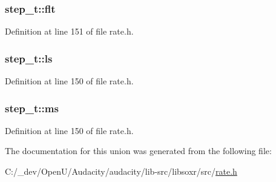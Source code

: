 \subsubsection[{\texorpdfstring{flt}{flt}}]{ step\+\_\+t\+::flt}\hypertarget{unionstep__t_af6633db2342cac0011856763d47f1844}{}\label{unionstep__t_af6633db2342cac0011856763d47f1844}


Definition at line 151 of file rate.\+h.

\subsubsection[{\texorpdfstring{ls}{ls}}]{ step\+\_\+t\+::ls}\hypertarget{unionstep__t_ad1babcdbc3f7c67b776f8a8b1169ee9d}{}\label{unionstep__t_ad1babcdbc3f7c67b776f8a8b1169ee9d}


Definition at line 150 of file rate.\+h.

\subsubsection[{\texorpdfstring{ms}{ms}}]{ step\+\_\+t\+::ms}\hypertarget{unionstep__t_a1d04e8601be9e3f539a6eccb17252df4}{}\label{unionstep__t_a1d04e8601be9e3f539a6eccb17252df4}


Definition at line 150 of file rate.\+h.



The documentation for this union was generated from the following file\+:\begin{DoxyCompactItemize}
\item 
C\+:/\+\_\+dev/\+Open\+U/\+Audacity/audacity/lib-\/src/libsoxr/src/\hyperlink{rate_8h}{rate.\+h}\end{DoxyCompactItemize}
